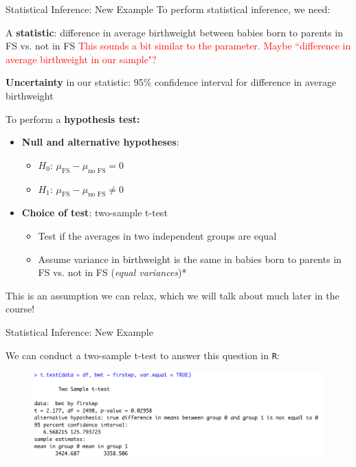 \documentclass[10pt,t]{beamer}
\begin{document}
\begin{frame}{Statistical Inference: New Example}
To perform statistical inference, we need:

\vspace{0.3cm}

A \textbf{statistic}: difference in average birthweight between babies born to parents in FS vs. not in FS \textcolor{red}{This sounds a bit similar to the parameter. Maybe ``difference in average birthweight in our sample"?}

\vspace{0.3cm}

\textbf{Uncertainty} in our statistic: 95\% confidence interval for difference in average birthweight

\vspace{0.3cm}

To perform a \textbf{hypothesis test:}

\begin{itemize}
	\item \textbf{Null and alternative hypotheses}:
	\begin{itemize}
		\item $H_0$: $\mu_{\text{FS}} - \mu_{\text{no FS}} = 0$
		\item $H_1$: $\mu_{\text{FS}} - \mu_{\text{no FS}} \neq 0$
	\end{itemize}
	\item \textbf{Choice of test}: two-sample t-test
	\begin{itemize}
		\item Test if the averages in two independent groups are equal
		\item Assume variance in birthweight is the same in babies born to parents in FS vs. not in FS (\textit{equal variances})*
	\end{itemize}
\end{itemize}

\small *This is an assumption we can relax, which we will talk about much later in the course!

\end{frame}

\begin{frame}{Statistical Inference: New Example}

We can conduct a two-sample t-test to answer this question in \texttt{R}:

\vspace{0.3cm}

\begin{figure}
\centering \includegraphics[scale=0.5]{ttest1.png}
\end{figure}

\end{frame}
\end{document}
